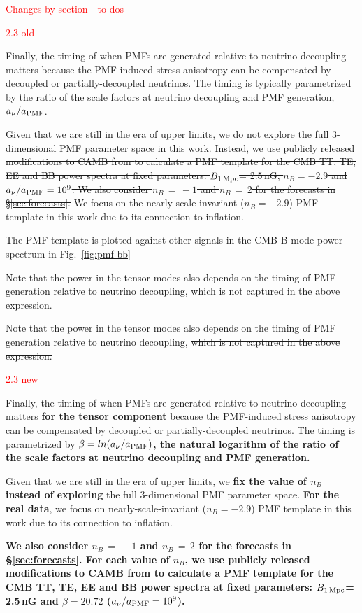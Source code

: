 \documentclass{article}
\newcommand{\bpmf}{\ensuremath{B_{\rm 1\,Mpc}}}
\newcommand{\changed}[1]{\textcolor{Red}{#1}}
\newcommand{\removed}[1]{\st{#1}}
\newcommand{\added}[1]{\textbf{#1}}
\begin{document}
\changed{Changes by section - to dos}

\changed{2.3 old}

Finally, the timing of when PMFs are generated relative to neutrino decoupling matters because the PMF-induced stress anisotropy can be compensated by decoupled or partially-decoupled neutrinos. 
The timing is \removed{typically parametrized by the ratio of the scale factors at neutrino decoupling and PMF generation, $a_{\nu}/a_{\rm{PMF}}$.}

Given that we are still in the era of upper limits, \removed{we do not explore} the full 3-dimensional PMF parameter space \removed{in this work. 
Instead, we use publicly released modifications to CAMB from \citet{zucca16} to calculate a PMF template for the CMB TT, TE, EE and BB power spectra at fixed parameters: \bpmf = 2.5\,nG, $n_B = -2.9$ and $a_{\nu}/a_{\rm{PMF}} = 10^9$. 
We also consider $n_B\,=\,-1$ and $n_B\,=\,2$ for the forecasts in \S\ref{sec:forecasts}.}
We focus on the nearly-scale-invariant ($n_B = -2.9$) PMF template in this work due to its connection to inflation.

The PMF template is plotted against other signals in the CMB B-mode power spectrum in Fig.~\ref{fig:pmf-bb}

Note that the power in the tensor modes also depends on the timing of PMF generation relative to neutrino decoupling, which is not captured in the above expression.

Note that the power in the tensor modes also depends on the timing of PMF generation relative to neutrino decoupling, \removed{which is not captured in the above expression.}

\changed{2.3 new}

Finally, the timing of when PMFs are generated relative to neutrino decoupling matters \added{for the tensor component} because the PMF-induced stress anisotropy can be compensated by decoupled or partially-decoupled neutrinos. 
The timing is  parametrized by \added{$\beta = ln(a_{\nu}/a_{\rm{PMF}})$,  the natural logarithm of the ratio of the scale factors at neutrino decoupling and PMF generation.}

Given that we are still in the era of upper limits, we \added{fix the value of $n_B$ instead of exploring} the full 3-dimensional PMF parameter space. 
\added{For the real data}, we focus on nearly-scale-invariant ($n_B = -2.9$) PMF template in this work due to its connection to inflation.

\added{We also consider $n_B\,=\,-1$ and $n_B\,=\,2$ for the forecasts in \S\ref{sec:forecasts}. 
For each value of $n_B$, we use publicly released modifications to CAMB from \citet{zucca16} to calculate a PMF template for the CMB TT, TE, EE and BB power spectra at fixed parameters: \bpmf = 2.5\,nG and $\beta=20.72$ ($a_{\nu}/a_{\rm{PMF}} = 10^9$).}
\end{document}
